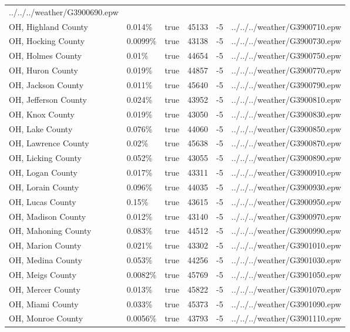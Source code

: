 \begin{longtable}[]{@{}llllll@{}}
../../../weather/G3900690.epw \\
OH, Highland County & 0.014\% & true & 45133 & -5 &
../../../weather/G3900710.epw \\
OH, Hocking County & 0.0099\% & true & 43138 & -5 &
../../../weather/G3900730.epw \\
OH, Holmes County & 0.01\% & true & 44654 & -5 &
../../../weather/G3900750.epw \\
OH, Huron County & 0.019\% & true & 44857 & -5 &
../../../weather/G3900770.epw \\
OH, Jackson County & 0.011\% & true & 45640 & -5 &
../../../weather/G3900790.epw \\
OH, Jefferson County & 0.024\% & true & 43952 & -5 &
../../../weather/G3900810.epw \\
OH, Knox County & 0.019\% & true & 43050 & -5 &
../../../weather/G3900830.epw \\
OH, Lake County & 0.076\% & true & 44060 & -5 &
../../../weather/G3900850.epw \\
OH, Lawrence County & 0.02\% & true & 45638 & -5 &
../../../weather/G3900870.epw \\
OH, Licking County & 0.052\% & true & 43055 & -5 &
../../../weather/G3900890.epw \\
OH, Logan County & 0.017\% & true & 43311 & -5 &
../../../weather/G3900910.epw \\
OH, Lorain County & 0.096\% & true & 44035 & -5 &
../../../weather/G3900930.epw \\
OH, Lucas County & 0.15\% & true & 43615 & -5 &
../../../weather/G3900950.epw \\
OH, Madison County & 0.012\% & true & 43140 & -5 &
../../../weather/G3900970.epw \\
OH, Mahoning County & 0.083\% & true & 44512 & -5 &
../../../weather/G3900990.epw \\
OH, Marion County & 0.021\% & true & 43302 & -5 &
../../../weather/G3901010.epw \\
OH, Medina County & 0.053\% & true & 44256 & -5 &
../../../weather/G3901030.epw \\
OH, Meigs County & 0.0082\% & true & 45769 & -5 &
../../../weather/G3901050.epw \\
OH, Mercer County & 0.013\% & true & 45822 & -5 &
../../../weather/G3901070.epw \\
OH, Miami County & 0.033\% & true & 45373 & -5 &
../../../weather/G3901090.epw \\
OH, Monroe County & 0.0056\% & true & 43793 & -5 &
../../../weather/G3901110.epw \\

\end{longtable}
